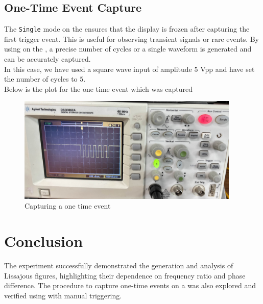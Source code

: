 \documentclass[a4paper,12pt]{article}
\begin{document}
\subsection*{One-Time Event Capture}
The \texttt{Single} mode on the  ensures that the display is frozen after capturing the first trigger event. This is useful for observing transient signals or rare events. By using  on the , a precise number of cycles or a single waveform is generated and can be accurately captured.\\
In this case, we have used a square wave input of amplitude $5$ Vpp and have set the number of cycles to $5$.\\
Below is the plot for the one time event which was captured\\
\begin{figure}[h!]
   \centering
   \includegraphics[width=300pt]{figs/one-time-event.jpeg}
   \caption{Capturing a one time event}
   \label{stemplot}
\end{figure}
\section*{Conclusion}
The experiment successfully demonstrated the generation and analysis of Lissajous figures, highlighting their dependence on frequency ratio and phase difference. The procedure to capture one-time events on a  was also explored and verified using  with manual triggering.
\end{document}
